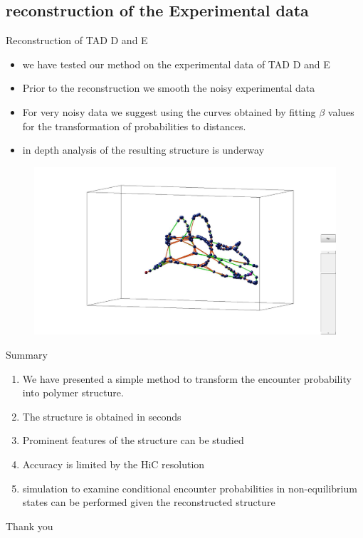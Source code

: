 \documentclass[8pt]{beamer}
\begin{document}
\subsection{reconstruction of the Experimental data}
\begin{frame}{Reconstruction of TAD D and E}
\begin{itemize}
\item we have tested our method on the experimental data of TAD D and E
\item Prior to the reconstruction we smooth the noisy experimental data
\item For very noisy data we suggest using the curves obtained by fitting $\beta$ values for the transformation of probabilities to distances. 
\item in depth analysis of the resulting structure is underway 
\end{itemize}
\begin{figure}
\includegraphics[scale=0.2]{reconstructionTADDAndE}
\end{figure}
\end{frame}


\begin{frame}{Summary}
\begin{enumerate}
\item We have presented a simple method to transform the encounter probability into polymer structure. 
\item The structure is obtained in seconds
\item Prominent features of the structure can be studied 
\item Accuracy is limited by the HiC resolution 
\item simulation to examine conditional encounter probabilities in non-equilibrium states can be performed given the reconstructed structure
\end{enumerate}
\end{frame}

\begin{frame}
Thank you
\end{frame}
\end{document}
